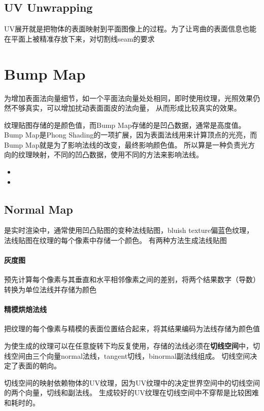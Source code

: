\subsection{UV Unwrapping}

UV展开就是把物体的表面映射到平面图像上的过程。为了让弯曲的表面信息也能在平面上被精准存放下来，对切割线seam的要求

\section{Bump Map}

为增加表面法向量细节，如一个平面法向量处处相同，即时使用纹理，光照效果仍然不够真实，可以增加扰动表面面皮的法向量，
从而形成比较真实的效果。

纹理贴图存储的是颜色值，而Bump Map存储的是凹凸数据，通常是高度值。
Bump Map是Phong Shading的一项扩展，因为表面法线用来计算顶点的光亮，而Bump Map就是为了影响法线的改变，最终影响颜色值。
所以算是一种负责光方向的纹理映射，不同的凹凸数据，使用不同的方法来影响法线。

\begin{itemize}
    \item {}
    \item {}
\end{itemize}

\subsection{Normal Map}

是实时渲染中，通常使用凹凸贴图的变种法线贴图，bluish texture偏蓝色纹理，法线贴图在纹理的每个像素中存储一个颜色。
有两种方法生成法线贴图
\paragraph{灰度图}
预先计算每个像素与其垂直和水平相邻像素之间的差别，将两个结果数字（导数）转换为单位法线并存储为颜色
\paragraph{精模烘焙法线}
把纹理的每个像素与精模的表面位置结合起来，将其结果编码为法线存储为颜色值

为使生成的纹理可以在任意旋转下均反复使用，存储的法线必须在\textbf{切线空间}中，切线空间由三个向量normal法线，tangent切线，binormal副法线组成。
切线空间决定了表面的朝向。

切线空间的映射依赖物体的UV纹理，因为UV纹理中的决定世界空间中的切线空间的两个向量，切线和副法线。
生成较好的UV纹理在切线空间中不穿帮是比较困难和耗时的。

